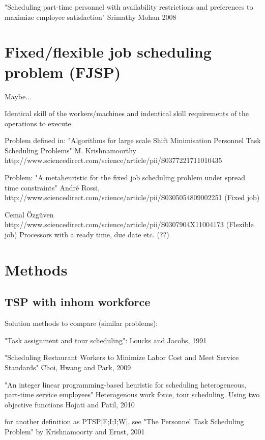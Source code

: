 "Scheduling part-time personnel with availability restrictions and preferences to maximize employee satisfaction" Srimathy Mohan 2008

\section{Fixed/flexible job scheduling problem (FJSP)}\label{FJSP}
Maybe...

Identical skill of the workers/machines and indentical skill requirements of the operations to execute.

Problem defined in: "Algorithms for large scale Shift Minimisation Personnel Task Scheduling Problems" M. Krishnamoorthy
http://www.sciencedirect.com/science/article/pii/S0377221711010435

Problem: "A metaheuristic for the fixed job scheduling problem under spread time constraints" André Rossi, http://www.sciencedirect.com/science/article/pii/S0305054809002251 (Fixed job)

Cemal Özgüven
http://www.sciencedirect.com/science/article/pii/S0307904X11004173 (Flexible job)
Processors with a ready time, due date etc. (??)

\section{Methods}
\subsection{TSP with inhom workforce}

Solution methods to compare (similar problems):

"Task assignment and tour scheduling": Loucks and Jacobs, 1991


"Scheduling Restaurant Workers to Minimize Labor Cost and Meet Service Standards" Choi, Hwang and Park, 2009

"An integer linear programming-based heuristic for scheduling heterogeneous, part-time service employees" Heterogenous work force, tour scheduling. Using two objective functions Hojati and Patil, 2010

for another definition as PTSP[F;I;I;W], see "The Personnel Task Scheduling Problem" by Krishnamoorty and Ernst, 2001



